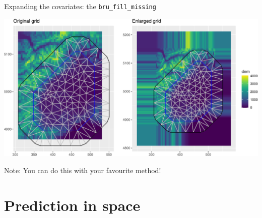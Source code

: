 \documentclass[
  ignorenonframetext,
]{beamer}
\begin{document}
\begin{frame}{Expanding the covariates: the \texttt{bru\_fill\_missing}}
\protect\hypertarget{expanding-the-covariates-the-bru_fill_missing-1}{}
\begin{center}\includegraphics[width=0.7\linewidth]{Part3_Spatial_files/figure-beamer/unnamed-chunk-37-1} \end{center}

Note: You can do this with your favourite method!
\end{frame}

\hypertarget{prediction-in-space}{%
\section{Prediction in space}\label{prediction-in-space}}
\end{document}
